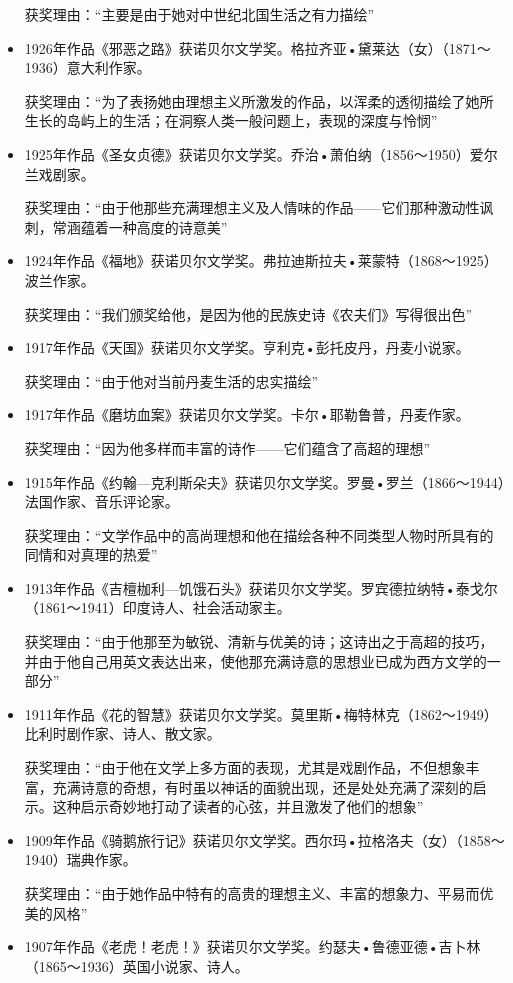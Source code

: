 \documentclass[UTF8,a4paper,8pt]{ctexbook}
\begin{document}
\begin{itemize}
			获奖理由：“主要是由于她对中世纪北国生活之有力描绘”
			\item 1926年作品《邪恶之路》获诺贝尔文学奖。格拉齐亚•黛莱达（女）（1871～1936）意大利作家。
			
			获奖理由：“为了表扬她由理想主义所激发的作品，以浑柔的透彻描绘了她所生长的岛屿上的生活；在洞察人类一般问题上，表现的深度与怜悯”
			\item 1925年作品《圣女贞德》获诺贝尔文学奖。乔治•萧伯纳（1856～1950）爱尔兰戏剧家。
		
			获奖理由：“由于他那些充满理想主义及人情味的作品——它们那种激动性讽刺，常涵蕴着一种高度的诗意美”
			\item 1924年作品《福地》获诺贝尔文学奖。弗拉迪斯拉夫•莱蒙特（1868～1925）波兰作家。
		
			获奖理由：“我们颁奖给他，是因为他的民族史诗《农夫们》写得很出色”
			\item 1917年作品《天国》获诺贝尔文学奖。亨利克•彭托皮丹，丹麦小说家。
		
			获奖理由：“由于他对当前丹麦生活的忠实描绘”
			\item 1917年作品《磨坊血案》获诺贝尔文学奖。卡尔•耶勒鲁普，丹麦作家。
		
			获奖理由：“因为他多样而丰富的诗作——它们蕴含了高超的理想”
			\item 1915年作品《约翰—克利斯朵夫》获诺贝尔文学奖。罗曼•罗兰（1866～1944）法国作家、音乐评论家。
		
			获奖理由：“文学作品中的高尚理想和他在描绘各种不同类型人物时所具有的同情和对真理的热爱”
			\item 1913年作品《吉檀枷利—饥饿石头》获诺贝尔文学奖。罗宾德拉纳特•泰戈尔（1861～1941）印度诗人、社会活动家主。
		
			获奖理由：“由于他那至为敏锐、清新与优美的诗；这诗出之于高超的技巧，并由于他自己用英文表达出来，使他那充满诗意的思想业已成为西方文学的一部分”
			\item 1911年作品《花的智慧》获诺贝尔文学奖。莫里斯•梅特林克（1862～1949）比利时剧作家、诗人、散文家。
		
			获奖理由：“由于他在文学上多方面的表现，尤其是戏剧作品，不但想象丰富，充满诗意的奇想，有时虽以神话的面貌出现，还是处处充满了深刻的启示。这种启示奇妙地打动了读者的心弦，并且激发了他们的想象”
			\item 1909年作品《骑鹅旅行记》获诺贝尔文学奖。西尔玛•拉格洛夫（女）（1858～1940）瑞典作家。
		
			获奖理由：“由于她作品中特有的高贵的理想主义、丰富的想象力、平易而优美的风格”
			\item 1907年作品《老虎！老虎！》获诺贝尔文学奖。约瑟夫•鲁德亚德•吉卜林（1865～1936）英国小说家、诗人。
		

\end{itemize}
\end{document}

